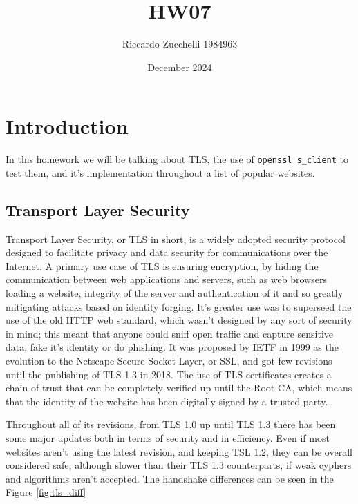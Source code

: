 \documentclass{article}
\title{HW07}
\author{Riccardo Zucchelli 1984963}
\date{December 2024}
\begin{document}
\maketitle

\section*{Introduction}
In this homework we will be talking about TLS, the use of \texttt{openssl s\_client} to test them, and it's implementation throughout a list of popular websites.
\subsection*{Transport Layer Security}
Transport Layer Security, or TLS in short, is a widely adopted security protocol designed to facilitate privacy and data security for communications over the Internet. A primary use case of TLS is ensuring encryption, by hiding the communication between web applications and servers, such as web browsers loading a website, integrity of the server and authentication of it and so greatly mitigating attacks based on identity forging. It's greater use was to superseed the use of the old HTTP web standard, which wasn't designed by any sort of security in mind; this meant that anyone could sniff open traffic and capture sensitive data, fake it's identity or do phishing. It was proposed by IETF in 1999 as the evolution to the Netscape Secure Socket Layer, or SSL, and got few revisions until the publishing of TLS 1.3 in 2018.
The use of TLS certificates creates a chain of trust that can be completely verified up until the Root CA, which means that the identity of the website has been digitally signed by a trusted party.

Throughout all of its revisions, from TLS 1.0 up until TLS 1.3 there has been some major updates both in terms of security and in efficiency. Even if most websites aren't using the latest revision, and keeping TSL 1.2, they can be overall considered safe, although slower than their TLS 1.3 counterparts, if weak cyphers and algorithms aren't accepted. The handshake differences can be seen in the Figure \ref{fig:tls_diff}
\end{document}

